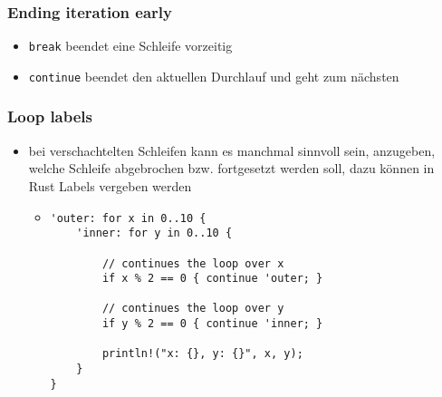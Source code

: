 \documentclass[a4paper,12pt]{article}
\begin{document}
\subsubsection*{Ending iteration early}
\begin{itemize}
  \item \verb|break| beendet eine Schleife vorzeitig
  \item \verb|continue| beendet den aktuellen Durchlauf und geht zum nächsten
\end{itemize}

\subsubsection*{Loop labels}
\begin{itemize}
  \item bei verschachtelten Schleifen kann es manchmal sinnvoll sein, anzugeben, welche Schleife abgebrochen bzw. fortgesetzt werden soll, dazu können in Rust Labels vergeben werden
  \begin{itemize}
  \item[]
\begin{verbatim}
'outer: for x in 0..10 {
    'inner: for y in 0..10 {

        // continues the loop over x
        if x % 2 == 0 { continue 'outer; }
        
        // continues the loop over y 
        if y % 2 == 0 { continue 'inner; } 
        
        println!("x: {}, y: {}", x, y);
    }
}
\end{verbatim}
  \end{itemize}
\end{itemize}
\end{document}
